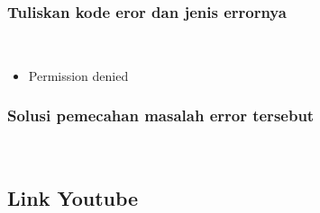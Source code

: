 	
	\subsubsection{Tuliskan kode eror dan jenis errornya}\hfill\\
		\begin{itemize}
		\item Permission denied
		
		
		\end{itemize}
	 
	\subsubsection{Solusi pemecahan masalah error tersebut}\hfill\\
		
	
\subsection{Link Youtube}
	
	\subsubsection{}\hfill\\
	